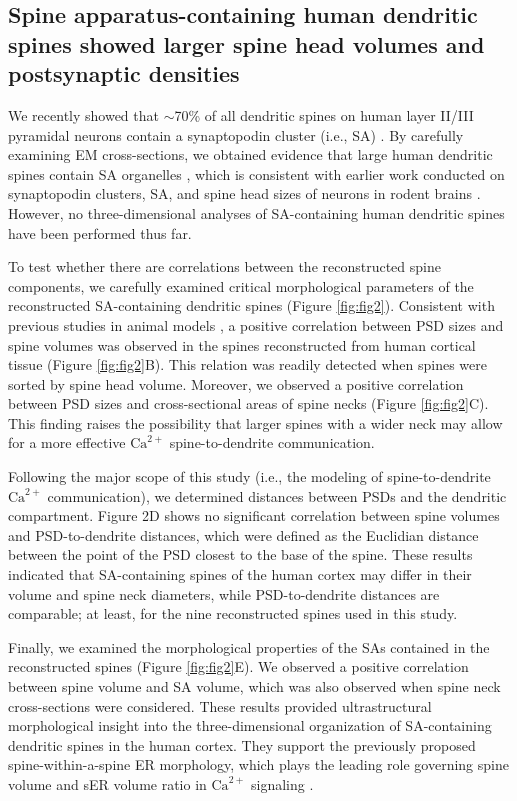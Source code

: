 \documentclass[12pt]{article}
\begin{document}
\subsection*{Spine apparatus-containing human dendritic spines showed larger spine head volumes and postsynaptic densities}
We recently showed that $\sim$70\% of all dendritic spines on human layer II/III pyramidal neurons contain a synaptopodin cluster (i.e., SA) \cite{Lenz2021}. By carefully examining EM cross-sections, we obtained evidence that large human dendritic spines contain SA organelles \cite{Lenz2021}, which is consistent with earlier work conducted on synaptopodin clusters, SA, and spine head sizes of neurons in rodent brains \cite{OkuboSuzuki2008, Vlachos2009, Vlachos2013,Yap2020}. However, no three-dimensional analyses of SA-containing human dendritic spines have been performed thus far. 

To test whether there are correlations between the reconstructed spine components, we carefully examined critical morphological parameters of the reconstructed SA-containing dendritic spines (Figure \ref{fig:fig2}). Consistent with previous studies in animal models \cite{Harris1989,Arellano2007}, a positive correlation between PSD sizes and spine volumes was observed in the spines reconstructed from human cortical tissue (Figure \ref{fig:fig2}B). This relation was readily detected when spines were sorted by spine head volume. Moreover, we observed a positive correlation between PSD sizes and cross-sectional areas of spine necks (Figure \ref{fig:fig2}C). This finding raises the possibility that larger spines with a wider neck may allow for a more effective $\textrm{Ca}^{2+}$ spine-to-dendrite communication. 

Following the major scope of this study (i.e., the modeling of spine-to-dendrite $\textrm{Ca}^{2+}$ communication), we determined distances between PSDs and the dendritic compartment. Figure 2D shows no significant correlation between spine volumes and PSD-to-dendrite distances, which were defined as the Euclidian distance between the point of the PSD closest to the base of the spine. These results indicated that SA-containing spines of the human cortex may differ in their volume and spine neck diameters, while PSD-to-dendrite distances are comparable; at least, for the nine reconstructed spines used in this study. 

Finally, we examined the morphological properties of the SAs contained in the reconstructed spines (Figure \ref{fig:fig2}E). We observed a positive correlation between spine volume and SA volume, which was also observed when spine neck cross-sections were considered. These results provided ultrastructural morphological insight into the three-dimensional organization of SA-containing dendritic spines in the human cortex. They support the previously proposed spine-within-a-spine ER morphology, which plays the leading role governing spine volume and sER volume ratio in $\textrm{Ca}^{2+}$ signaling \cite{Berridge2000,Bell2019}. 
\end{document}
